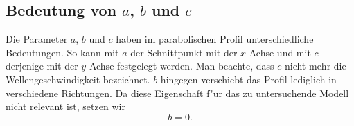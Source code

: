 \subsection{Bedeutung von \texorpdfstring{$a$}{a}, \texorpdfstring{$b$}{b} und 
\texorpdfstring{$c$}{c}}
Die Parameter $a$, $b$ und $c$ haben im parabolischen Profil unterschiedliche 
Bedeutungen. So kann mit $a$ der Schnittpunkt mit der $x$-Achse 
und mit $c$ derjenige mit der $y$-Achse festgelegt werden. Man beachte, dass 
$c$ nicht mehr die Wellengeschwindigkeit bezeichnet. $b$ hingegen 
verschiebt das Profil lediglich in verschiedene Richtungen. Da diese 
Eigenschaft f"ur das zu untersuchende Modell nicht relevant ist, setzen wir
\begin{equation*}
	b = 0.
\end{equation*}